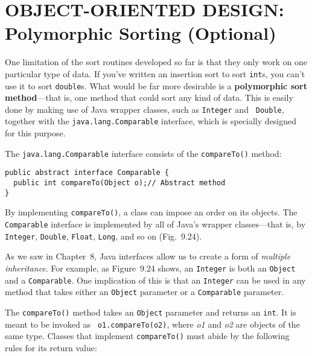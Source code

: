 
\section{OBJECT-ORIENTED DESIGN: \\[2pt]Polymorphic Sorting (Optional)}


\noindent One limitation of the sort routines developed so far is that they only
work on one particular type of data. If you've written an insertion
sort to sort {\tt int}s, you can't use it to sort {\tt double}s. What
would be far more desirable is a {\bf polymorphic sort method}---that
is, one method that could sort any kind of data. This is easily done
by making use of Java wrapper classes, such as {\tt Integer} and {\tt
Double}, together with the {\tt java.lang.Comparable} interface, which
is specially designed for this purpose.

The {\tt java.lang.Comparable} interface consists of the
\mbox{\tt compareTo()} method:

\begin{jjjlisting}
\begin{lstlisting}
public abstract interface Comparable {
  public int compareTo(Object o);// Abstract method
}
\end{lstlisting}
\end{jjjlisting}

\noindent By implementing {\tt compareTo()}, a class
can impose an order on its objects. The {\tt Comparable}
interface is implemented by all of Java's wrapper classes---that is,
by {\tt Integer}, {\tt Double}, {\tt Float}, {\tt Long}, and so on
(Fig.~9.24).

As we saw in Chapter~8, Java interfaces allow us to create a form of
{\em multiple inheritance}. For example, as Figure~9.24 shows, an
{\tt Integer} is both an \mbox{\tt Object} and a {\tt Comparable}. One
implication of this is that an {\tt Integer} can be used in any method
that takes either an {\tt Object} parameter or a {\tt Comparable}
parameter.

The {\tt compareTo()} method takes an {\tt Object} parameter and
returns an {\tt int}. It is meant to be invoked as {\tt
o1.compareTo(o2)}, where {\em o1} and {\em o2} are objects of the same
type. Classes that implement {\tt compareTo()} must abide by the
following rules for its return value:

